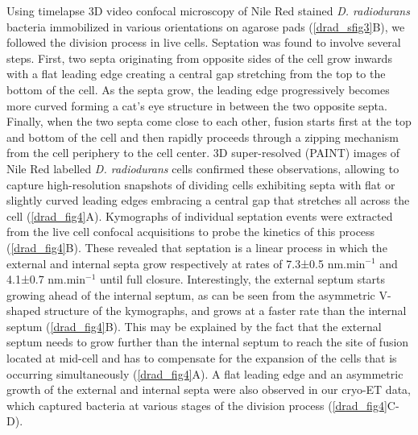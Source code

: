 Using timelapse 3D video confocal microscopy of Nile Red stained \textit{D. radiodurans} bacteria immobilized in various orientations on agarose pads (\autoref{drad_sfig3}B), we followed the division process in live cells.
Septation was found to involve several steps.
First, two septa originating from opposite sides of the cell grow inwards with a flat leading edge creating a central gap stretching from the top to the bottom of the cell.
As the septa grow, the leading edge progressively becomes more curved forming a cat's eye structure in between the two opposite septa.
Finally, when the two septa come close to each other, fusion starts first at the top and bottom of the cell and then rapidly proceeds through a zipping mechanism from the cell periphery to the cell center.
3D super-resolved (PAINT) images of Nile Red labelled \textit{D. radiodurans} cells confirmed these observations, allowing to capture high-resolution snapshots of dividing cells exhibiting septa with flat or slightly curved leading edges embracing a central gap that stretches all across the cell (\autoref{drad_fig4}A).
Kymographs of individual septation events were extracted from the live cell confocal acquisitions to probe the kinetics of this process (\autoref{drad_fig4}B).
These revealed that septation is a linear process in which the external and internal septa grow respectively at rates of 7.3±0.5 nm.min$^{-1}$  and 4.1±0.7 nm.min$^{-1}$ until full closure.
Interestingly, the external septum starts growing ahead of the internal septum, as can be seen from the asymmetric V-shaped structure of the kymographs, and grows at a faster rate than the internal septum (\autoref{drad_fig4}B).
This may be explained by the fact that the external septum needs to grow further than the internal septum to reach the site of fusion located at mid-cell and has to compensate for the expansion of the cells that is occurring simultaneously (\autoref{drad_fig4}A).
A flat leading edge and an asymmetric growth of the external and internal septa were also observed in our cryo-ET data, which captured bacteria at various stages of the division process (\autoref{drad_fig4}C-D).

